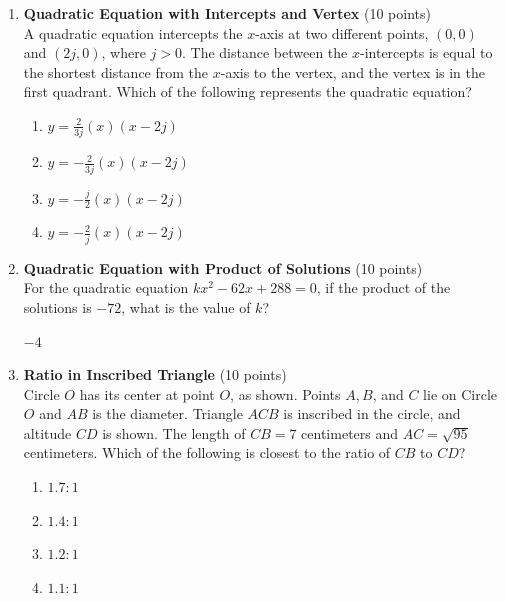 \begin{enumerate}
  \item \textbf{Quadratic Equation with Intercepts and Vertex} (10 points)\\
  A quadratic equation intercepts the $x$-axis at two different points, $(0,0)$ and $(2j, 0)$, where $j>0$. The distance between the $x$-intercepts is equal to the shortest distance from the $x$-axis to the vertex, and the vertex is in the first quadrant. Which of the following represents the quadratic equation?
  \begin{enumerate}[label=(\Alph*)]
    \item $y=\frac{2}{3j}(x)(x-2j)$
    \item $y=-\frac{2}{3j}(x)(x-2j)$
    \item $y=-\frac{j}{2}(x)(x-2j)$
    \item $y=-\frac{2}{j}(x)(x-2j)$
  \end{enumerate}
  \begin{subanswer}
  \end{subanswer}





  \item \textbf{Quadratic Equation with Product of Solutions} (10 points)\\
  For the quadratic equation $kx^2 - 62x + 288 = 0$, if the product of the solutions is $-72$, what is the value of $k$?
  \begin{subanswer}
    $-4$
  \end{subanswer}

  \item \textbf{Ratio in Inscribed Triangle} (10 points)\\
  Circle $O$ has its center at point $O$, as shown. Points $A, B$, and $C$ lie on Circle $O$ and $AB$ is the diameter. Triangle $ACB$ is inscribed in the circle, and altitude $CD$ is shown. The length of $CB=7$ centimeters and $AC=\sqrt{95}$ centimeters. Which of the following is closest to the ratio of $CB$ to $CD$?
  \begin{enumerate}[label=(\Alph*)]
    \item $1.7:1$
    \item $1.4:1$
    \item $1.2:1$
    \item $1.1:1$
  \end{enumerate}
  \begin{subanswer}
  \end{subanswer}



\end{enumerate}

